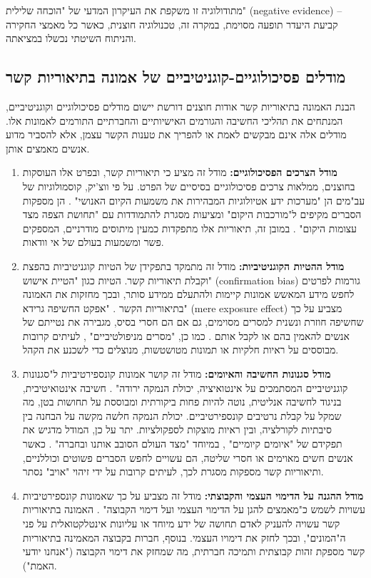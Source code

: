\documentclass[12pt,a4paper]{article}
\begin{document}
מתודולוגיה זו משקפת את העיקרון המדעי של "הוכחה שלילית" (negative evidence) – קביעת היעדר תופעה מסוימת, במקרה זה, טכנולוגיה חוצנית, כאשר כל מאמצי החקירה והניתוח השיטתי נכשלו במציאתה.

\subsection{מודלים פסיכולוגיים-קוגניטיביים של אמונה בתיאוריות קשר}
הבנת האמונה בתיאוריות קשר אודות חוצנים דורשת יישום מודלים פסיכולוגיים וקוגניטיביים, המנתחים את תהליכי החשיבה והגורמים האישיותיים והחברתיים התורמים לאמונות אלו. מודלים אלה אינם מבקשים לאמת או להפריך את טענות הקשר עצמן, אלא להסביר מדוע אנשים מאמצים אותן.

\begin{enumerate}
    \item \textbf{מודל הצרכים הפסיכולוגיים:} מודל זה מציע כי תיאוריות קשר, ובפרט אלו העוסקות בחוצנים, ממלאות צרכים פסיכולוגיים בסיסיים של הפרט. על פי ווצ'יק, קוסמולוגיות של עב"מים הן "מערכות ידע אטיולוגיות המבהירות את משמעות הקיום האנושי" \cite[p. 3]{s41599-025-04799-8}. הן מספקות הסברים מקיפים ל"מורכבות היקום" \cite[p. 3]{s41599-025-04799-8} ומציעות מסגרת להתמודדות עם "תחושת הצפה מצד עצומות היקום" \cite[p. 3]{s41599-025-04799-8}. במובן זה, תיאוריות אלו מתפקדות כמעין מיתוסים מודרניים, המספקים פשר ומשמעות בעולם של אי וודאות.
    \item \textbf{מודל ההטיות הקוגניטיביות:} מודל זה מתמקד בתפקידן של הטיות קוגניטיביות בהפצת וקבלת תיאוריות קשר. הטיות כגון "הטיית אישוש" (confirmation bias) גורמות לפרטים לחפש מידע המאשש אמונות קיימות ולהתעלם ממידע סותר, ובכך מחזקות את האמונה בתיאוריות הקשר \cite[p. 3]{s41599-025-04799-8}. "אפקט החשיפה גרידא" (mere exposure effect) מצביע על כך שחשיפה חוזרת ונשנית למסרים מסוימים, גם אם הם חסרי בסיס, מגבירה את נטייתם של אנשים להאמין בהם או לקבל אותם \cite[p. 3]{s41599-025-04799-8}. כמו כן, "מסרים מניפולטיביים" \cite[p. 3]{s41599-025-04799-8}, לעיתים קרובות מבוססים על ראיות חלקיות או תמונות מטושטשות, מנוצלים כדי לשכנע את הקהל.
    \item \textbf{מודל סגנונות החשיבה והאיומים:} מודל זה קושר אמונות קונספירטיביות ל"סגנונות קוגניטיביים המסתמכים על אינטואיציה, יכולת הנמקה ירודה" \cite[p. 4]{s41599-025-04799-8}. חשיבה אינטואיטיבית, בניגוד לחשיבה אנליטית, נוטה להיות פחות ביקורתית ומבוססת על תחושות בטן, מה שמקל על קבלת נרטיבים קונספירטיביים. יכולת הנמקה חלשה מקשה על הבחנה בין סיבתיות לקורלציה, ובין ראיות מוצקות לספקולציות. יתר על כן, המודל מדגיש את תפקידם של "איומים קיומיים" \cite[p. 4]{s41599-025-04799-8}, במיוחד "מצד העולם הסובב אותנו ובחברה" \cite[p. 4]{s41599-025-04799-8}. כאשר אנשים חשים מאוימים או חסרי שליטה, הם עשויים לחפש הסברים פשוטים וכוללניים, ותיאוריות קשר מספקות מסגרת לכך, לעיתים קרובות על ידי זיהוי "אויב" נסתר.
    \item \textbf{מודל ההגנה על הדימוי העצמי והקבוצתי:} מודל זה מצביע על כך שאמונות קונספירטיביות עשויות לשמש כ"מאמצים להגן על הדימוי העצמי ועל דימוי הקבוצה" \cite[p. 4]{s41599-025-04799-8}. האמונה בתיאוריות קשר עשויה להעניק לאדם תחושה של ידע מיוחד או עליונות אינטלקטואלית על פני ה"המונים", ובכך לחזק את דימויו העצמי. בנוסף, חברות בקבוצה המאמינה בתיאוריות קשר מספקת זהות קבוצתית ותמיכה חברתית, מה שמחזק את דימוי הקבוצה ("אנחנו יודעי האמת").
\end{enumerate}
\end{document}
